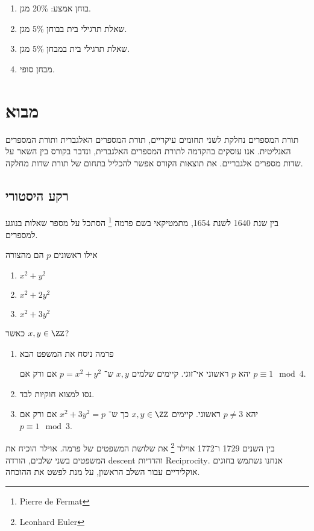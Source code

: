 \documentclass[a4paper,10pt,twoside,openany]{book}
\begin{document}
\begin{enumerate}
\item בוחן אמצע: 20\% מגן.
\item שאלת תרגילי בית בבוחן
5\%
מגן.
\item שאלת תרגילי בית במבחן
5\%
מגן.
\item מבחן סופי.
\end{enumerate}

\mainmatter

\chapter{מבוא}
תורת המספרים נחלקת לשני תחומים עיקריים, תורת המספרים האלגברית ותורת המספרים האנליטית.
אנו עוסקים בהקדמה לתורת המספרים האלגברית, ונדבר בקורס בין השאר על שדות מספרים אלגבריים. את תוצאות הקורס אפשר להכליל בתחום של תורת שדות מחלקה.
\section{רקע היסטורי}

בין שנת 1640 לשנת 1654, מתמטיקאי בשם פרמה%
\footnote{Pierre de Fermat}
הסתכל על מספר שאלות בנוגע למספרים.%
\begin{question}
אילו ראשונים
$p$
הם מהצורה
\begin{enumerate}
\item $x^2 + y^2$
\item $x^2 + 2y^2$
\item $x^2 + 3y^2$
\end{enumerate}
כאשר
$x,y \in \ZZ$?
\end{question}
\begin{solution}
\begin{enumerate}
\item פרמה ניסח את המשפט הבא
\begin{theorem}
יהא
$p$
ראשוני אי־זוגי. קיימים שלמים
$x,y$
ש־%
$p= x^2 + y^2$
אם ורק אם
$p \equiv 1 \mod{4}$.
\end{theorem}
\item נסו למצוא חוקיות לבד.

\item
\begin{theorem}[פרמה]
 יהא
$p \neq 3$
ראשוני. קיימים
$x,y \in \ZZ$
כך ש־%
$x^2 + 3y^2 = p$
אם ורק אם
$p \equiv 1 \mod{3}$.
\end{theorem}
\end{enumerate}
\end{solution}
בין השנים 1729 ו־1772 אוילר%
\footnote{Leonhard Euler}
את שלושת המשפטים של פרמה.
אוילר הוכיח את המשפטים בשני שלבים, הורדה
\textenglish{descent}
והדדיות
\textenglish{Reciprocity}.
אנחנו נשתמש בחוגים אוקלידיים עבור השלב הראשון, על מנת לפשט את ההוכחה.
\end{document}
